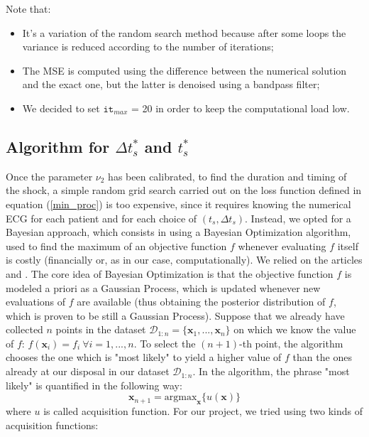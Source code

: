 \documentclass[11pt,a4paper]{article}
\begin{document}
\noindent
Note that:
\begin{itemize}
    \item It's a variation of the random search method because after some loops the variance is reduced according to the number of iterations;
    \item The MSE is computed using the difference between the numerical solution and the exact one, but the latter is denoised using a bandpass filter;
    \item We decided to set $\texttt{it}_{max}$ = 20 in order to keep the computational load low.
\end{itemize}

\subsection{Algorithm for $\Delta t_{s}^{*}$ and $t_{s}^{*}$}\label{alg_t}
Once the parameter $\nu_2$ has been calibrated, to find the duration and timing of the shock, a simple random grid search carried out on the loss function defined in equation (\ref{min_proc}) is too expensive, since it requires knowing the numerical ECG for each patient and for each choice of $(t_s, \Delta t_s)$. Instead, we opted for a Bayesian approach, which consists in using a Bayesian Optimization algorithm, used to find the maximum of an objective function $f$ whenever evaluating $f$ itself is costly (financially or, as in our case, computationally). We relied on the articles \cite{bayesopt_1} and \cite{bayesopt_2}. \newline
The core idea of Bayesian Optimization is that the objective function $f$ is modeled a priori as a Gaussian Process, which is updated whenever new evaluations of $f$ are available (thus obtaining the posterior distribution of $f$, which is proven to be still a Gaussian Process). Suppose that we already have collected $n$ points in the dataset $\mathcal{D}_{1:n} = \{\boldsymbol{x}_1,...,\boldsymbol{x}_n\}$ on which we know the value of $f$: $f(\boldsymbol{x}_i) = f_i \ \forall i = 1,...,n$. To select the $(n+1)$-th point, the algorithm chooses the one which is "most likely" to yield a higher value of $f$ than the ones already at our disposal in our dataset $\mathcal{D}_{1:n}$. In the algorithm, the phrase "most likely" is quantified in the following way:
\begin{equation} \label{acqfunc}
    \boldsymbol{x}_{n+1} = \textrm{argmax}_{\boldsymbol{x}} \{u(\boldsymbol{x})\}
\end{equation}
where $u$ is called acquisition function. For our project, we tried using two kinds of acquisition functions:\\
\end{document}
